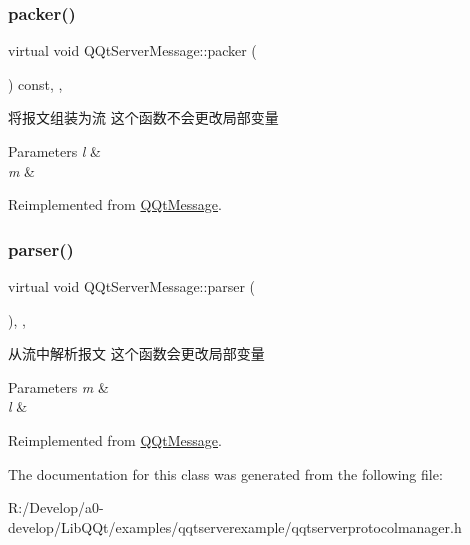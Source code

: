 \subsubsection{\texorpdfstring{packer()}{packer()}}
{\footnotesize\ttfamily virtual void Q\+Qt\+Server\+Message\+::packer (\begin{DoxyParamCaption}\item[{Q\+Byte\+Array \&}]{ }\end{DoxyParamCaption}) const\hspace{0.3cm}{\ttfamily [inline]}, {\ttfamily [override]}, {\ttfamily [virtual]}}



将报文组装为流 这个函数不会更改局部变量 


\begin{DoxyParams}{Parameters}
{\em l} & \\
\hline
{\em m} & \\
\hline
\end{DoxyParams}


Reimplemented from \mbox{\hyperlink{class_q_qt_message_af1885c2c3628495808dca66ee8d72e14}{Q\+Qt\+Message}}.

\mbox{\label{class_q_qt_server_message_a4f1ed5558eab8c286d61bfc224b0b7a7}} 
\subsubsection{\texorpdfstring{parser()}{parser()}}
{\footnotesize\ttfamily virtual void Q\+Qt\+Server\+Message\+::parser (\begin{DoxyParamCaption}\item[{const Q\+Byte\+Array \&}]{ }\end{DoxyParamCaption})\hspace{0.3cm}{\ttfamily [inline]}, {\ttfamily [override]}, {\ttfamily [virtual]}}



从流中解析报文 这个函数会更改局部变量 


\begin{DoxyParams}{Parameters}
{\em m} & \\
\hline
{\em l} & \\
\hline
\end{DoxyParams}


Reimplemented from \mbox{\hyperlink{class_q_qt_message_a0bc25669bdd61490b1d8df6d77565f31}{Q\+Qt\+Message}}.



The documentation for this class was generated from the following file\+:\begin{DoxyCompactItemize}
\item 
R\+:/\+Develop/a0-\/develop/\+Lib\+Q\+Qt/examples/qqtserverexample/qqtserverprotocolmanager.\+h\end{DoxyCompactItemize}
